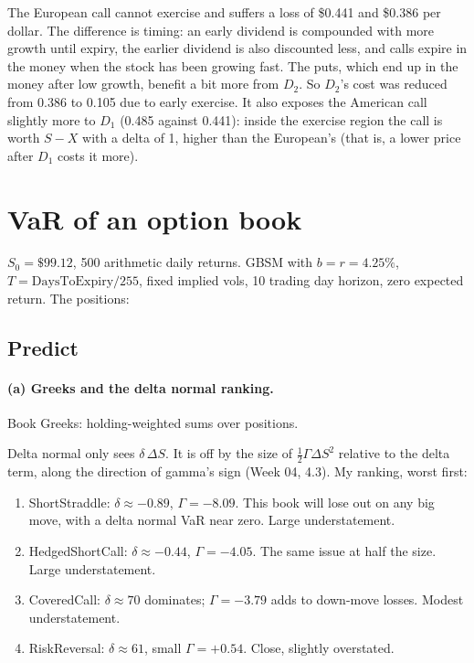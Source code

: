 \documentclass[11pt]{article}
\newcommand{\tbl}[1]{}
\begin{document}
The European call cannot exercise and suffers a loss of \$0.441 and \$0.386 per dollar. The difference is timing: an early dividend is compounded with more growth until expiry, the earlier dividend is also discounted less, and calls expire in the money when the stock has been growing fast. The puts, which end up in the money after low growth, benefit a bit more from $D_2$. So $D_2$'s cost was reduced from 0.386 to 0.105 due to early exercise. It also exposes the American call slightly more to $D_1$ (0.485 against 0.441): inside the exercise region the call is worth $S-X$ with a delta of 1, higher than the European's (that is, a lower price after $D_1$ costs it more).

\section{VaR of an option book}

$S_0=\$99.12$, 500 arithmetic daily returns. GBSM with $b=r=4.25\%$, $T=\text{DaysToExpiry}/255$, fixed implied vols, 10 trading day horizon, zero expected return. The positions:

\begin{table}[H]
\centering\small
\caption{The four books.}
\tbl{p3_positions}
\end{table}

\subsection*{Predict}

\paragraph{(a) Greeks and the delta normal ranking.} Book Greeks: holding-weighted sums over positions.

\begin{table}[H]
\centering\small
\caption{Book value and Greeks at \$99.12; $\Theta$ per year and its 10 day carry.}
\label{tab:p3greeks}
\tbl{p3_greeks}
\end{table}

Delta normal only sees $\delta\,\Delta S$. It is off by the size of $\tfrac12\Gamma\Delta S^2$ relative to the delta term, along the direction of gamma's sign (Week 04, 4.3). My ranking, worst first:
\begin{enumerate}\setlength\itemsep{0.1em}
\item ShortStraddle: $\delta\approx-0.89$, $\Gamma=-8.09$. This book will lose out on any big move, with a delta normal VaR near zero. Large understatement.
\item HedgedShortCall: $\delta\approx-0.44$, $\Gamma=-4.05$. The same issue at half the size. Large understatement.
\item CoveredCall: $\delta\approx70$ dominates; $\Gamma=-3.79$ adds to down-move losses. Modest understatement.
\item RiskReversal: $\delta\approx61$, small $\Gamma=+0.54$. Close, slightly overstated.
\end{enumerate}
\end{document}

